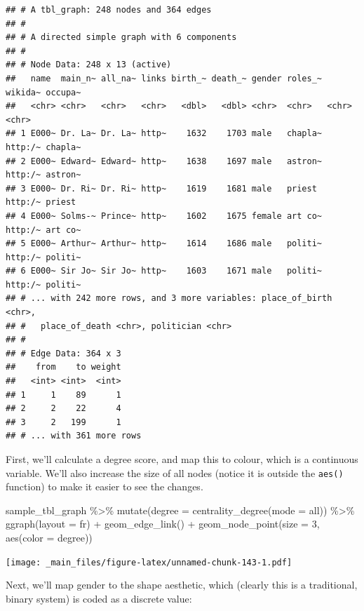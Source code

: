 \documentclass[
]{book}
\newenvironment{Shaded}{\begin{snugshade}}{\end{snugshade}}
\newcommand{\AttributeTok}[1]{\textcolor[rgb]{0.77,0.63,0.00}{#1}}
\newcommand{\DecValTok}[1]{\textcolor[rgb]{0.00,0.00,0.81}{#1}}
\newcommand{\FunctionTok}[1]{\textcolor[rgb]{0.00,0.00,0.00}{#1}}
\newcommand{\NormalTok}[1]{#1}
\newcommand{\SpecialCharTok}[1]{\textcolor[rgb]{0.00,0.00,0.00}{#1}}
\newcommand{\StringTok}[1]{\textcolor[rgb]{0.31,0.60,0.02}{#1}}
\begin{document}
\begin{verbatim}
## # A tbl_graph: 248 nodes and 364 edges
## #
## # A directed simple graph with 6 components
## #
## # Node Data: 248 x 13 (active)
##   name  main_n~ all_na~ links birth_~ death_~ gender roles_~ wikida~ occupa~
##   <chr> <chr>   <chr>   <chr>   <dbl>   <dbl> <chr>  <chr>   <chr>   <chr>  
## 1 E000~ Dr. La~ Dr. La~ http~    1632    1703 male   chapla~ http:/~ chapla~
## 2 E000~ Edward~ Edward~ http~    1638    1697 male   astron~ http:/~ astron~
## 3 E000~ Dr. Ri~ Dr. Ri~ http~    1619    1681 male   priest  http:/~ priest 
## 4 E000~ Solms-~ Prince~ http~    1602    1675 female art co~ http:/~ art co~
## 5 E000~ Arthur~ Arthur~ http~    1614    1686 male   politi~ http:/~ politi~
## 6 E000~ Sir Jo~ Sir Jo~ http~    1603    1671 male   politi~ http:/~ politi~
## # ... with 242 more rows, and 3 more variables: place_of_birth <chr>,
## #   place_of_death <chr>, politician <chr>
## #
## # Edge Data: 364 x 3
##    from    to weight
##   <int> <int>  <int>
## 1     1    89      1
## 2     2    22      4
## 3     2   199      1
## # ... with 361 more rows
\end{verbatim}

First, we'll calculate a degree score, and map this to colour, which is a continuous variable. We'll also increase the size of all nodes (notice it is outside the \texttt{aes()} function) to make it easier to see the changes.

\begin{Shaded}
\begin{Highlighting}[]
\NormalTok{sample\_tbl\_graph }\SpecialCharTok{\%\textgreater{}\%} 
  \FunctionTok{mutate}\NormalTok{(}\AttributeTok{degree =} \FunctionTok{centrality\_degree}\NormalTok{(}\AttributeTok{mode =} \StringTok{\textquotesingle{}all\textquotesingle{}}\NormalTok{)) }\SpecialCharTok{\%\textgreater{}\%} 
  \FunctionTok{ggraph}\NormalTok{(}\AttributeTok{layout =} \StringTok{\textquotesingle{}fr\textquotesingle{}}\NormalTok{) }\SpecialCharTok{+} 
  \FunctionTok{geom\_edge\_link}\NormalTok{() }\SpecialCharTok{+} 
  \FunctionTok{geom\_node\_point}\NormalTok{(}\AttributeTok{size =} \DecValTok{3}\NormalTok{, }\FunctionTok{aes}\NormalTok{(}\AttributeTok{color =}\NormalTok{ degree))}
\end{Highlighting}
\end{Shaded}

\texttt{[image: \_main\_files/figure-latex/unnamed-chunk-143-1.pdf]}

Next, we'll map gender to the shape aesthetic, which (clearly this is a traditional, binary system) is coded as a discrete value:
\end{document}
